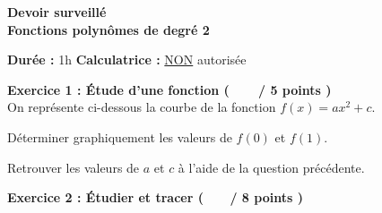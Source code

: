 \documentclass[12pt,a4paper]{exam}
\begin{document}
\begin{center}
    \Large\textbf{Devoir surveillé\\Fonctions polynômes de degré 2}
\end{center}

\vspace{0.3cm}

\noindent
\textbf{Durée :} 1h \hfill
\textbf{Calculatrice :} \underline{NON} autorisée

\vspace{0.5cm}

\noindent
\textbf{Exercice 1 : Étude d’une fonction (\ \ \ \  / 5 points )}
\vspace{5pt}
\noindent\\On représente ci-dessous la courbe de la fonction $f(x) = ax^2+c$.

\begin{center}
\end{center}


\begin{questions}

\question[2] Déterminer graphiquement les valeurs de $f(0)$ et $f(1)$.

\question[3] Retrouver les valeurs de $a$ et $c$ à l'aide de la question
précédente.

\end{questions}

\vspace{0.5cm}

\noindent
\textbf{Exercice 2 : Étudier et tracer ( \ \ \ / 8 points )}
\end{document}
